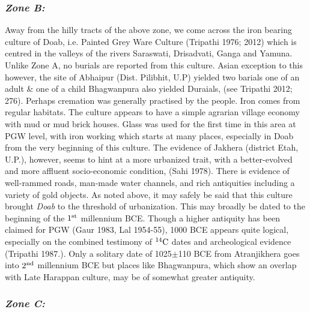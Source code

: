 \vspace{-.4cm}

\subsubsection*{\textit{Zone B:}}

\vspace{-.2cm}

Away from the hilly tracts of the above zone, we come across the iron bearing culture of Doab, i.e. Painted Grey Ware Culture (Tripathi 1976; 2012) which is centred in the valleys of the rivers Saraswati, Drisadvati, Ganga and Yamuna. Unlike Zone A, no burials are reported from this culture. Asian exception to this however, the site of Abhaipur (Dist. Pilibhit, U.P) yielded two barials one of an adult \& one of a child Bhagwanpura also yielded Duraials, (see Tripathi 2012; 276). Perhaps cremation was generally practised by the people. Iron comes from regular habitats. The culture appears to have a simple agrarian village economy with mud or mud brick houses. Glass was used for the first time in this area at PGW level, with iron working which starts at many places, especially in Doab from the very beginning of this culture. The evidence of Jakhera (district Etah, U.P.), however, seems to hint at a more urbanized trait, with a better-evolved and more affluent socio-economic condition, (Sahi 1978). There is evidence of well-rammed roads, man-made water channels, and rich antiquities including a variety of gold objects. As noted above, it may safely be said that this culture brought \textit{Doab} to the threshold of urbanization. This may broadly be dated to the beginning of the $1^{\rm st}$ millennium BCE. Though a higher antiquity has been claimed for PGW (Gaur 1983, Lal 1954-55), 1000 BCE appears quite logical, especially on the combined testimony of $^{14}{\rm C}$ dates and archeological evidence (Tripathi 1987.). Only a solitary date of 1025$\pm$110 BCE from Atranjikhera goes into $2^{\rm nd}$ millennium BCE but places like Bhagwanpura, which show an overlap with Late Harappan culture, may be of somewhat greater antiquity.

\newpage
\vspace{-.3cm}

\subsubsection*{\textit{Zone C:}}

\vspace{-.2cm}

